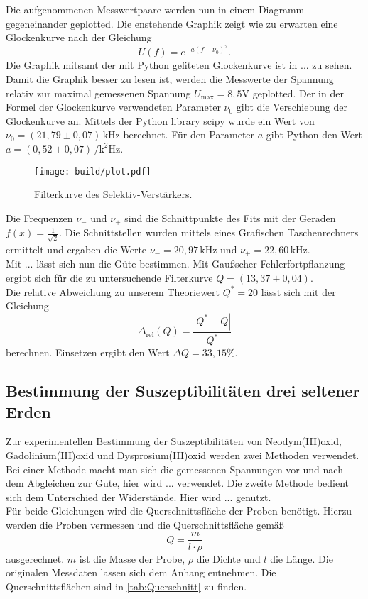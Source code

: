 Die aufgenommenen Messwertpaare werden nun in einem Diagramm gegeneinander geplotted. Die 
enstehende Graphik zeigt wie zu erwarten eine Glockenkurve nach der Gleichung
\begin{equation*}
  U(f) = e^{-a(f-\nu_0)^2}.
\end{equation*}
Die Graphik mitsamt der mit Python gefiteten Glockenkurve ist in ... zu sehen.\\
Damit die Graphik besser zu lesen ist, werden die Messwerte der Spannung relativ zur 
maximal gemessenen Spannung $U_{\mathrm{max}} = 8,5 \si{\volt}$ geplotted. Der in der Formel
der Glockenkurve verwendeten Parameter $\nu_0$ gibt die Verschiebung der Glockenkurve an.
Mittels der Python library scipy wurde ein Wert von $\nu_0 = (21,79 \pm 0,07) \, \si{\kilo\hertz} $
berechnet. Für den Parameter $a$ gibt Python den Wert 
$a = (0,52 \pm 0,07 ) \, \si{\per\square\kilo\hertz}$.\\
\begin{figure}
  \centering
  \texttt{[image: build/plot.pdf]}
  \caption{Filterkurve des Selektiv-Verstärkers.}
  \label{Abb:Absorption}
\end{figure}
Die Frequenzen $\nu_{-}$ und $\nu_{+}$ sind die Schnittpunkte des Fits mit der Geraden
$f(x) = \frac{1}{\sqrt{2}}$. Die Schnittstellen wurden mittels eines Grafischen Taschenrechners
ermittelt und ergaben die Werte $\nu_{-} = 20,97 \, \si{\kilo\hertz}$ und $\nu_{+} = 22,60 \, \si{\kilo\hertz}$.\\
Mit ... lässt sich nun die Güte bestimmen. Mit Gaußscher Fehlerfortpflanzung ergibt sich
für die zu untersuchende Filterkurve $Q = (13,37 \pm 0,04)$.\\
Die relative Abweichung zu unserem Theoriewert $Q^* = 20$ lässt sich mit der Gleichung
\begin{equation*}
    \Delta_{\mathrm{rel}}(Q) = \frac{|Q^* - Q|}{Q^*}
\end{equation*}
berechnen. Einsetzen ergibt den Wert $\Delta Q = 33,15 \%$.\\

\subsection{Bestimmung der Suszeptibilitäten drei seltener Erden}

Zur experimentellen Bestimmung der Suszeptibilitäten von Neodym(III)oxid, 
Gadolinium(III)oxid und Dysprosium(III)oxid werden zwei Methoden verwendet. 
Bei einer Methode macht man sich die gemessenen Spannungen vor und 
nach dem Abgleichen zur Gute, hier wird ... verwendet. Die zweite Methode
bedient sich dem Unterschied der Widerstände. Hier wird ... genutzt.\\
Für beide Gleichungen wird die Querschnittsfläche der Proben benötigt.
Hierzu werden die Proben vermessen und die Querschnittsfläche gemäß
\begin{equation*}
  Q = \frac{m}{l \cdot \rho}
\end{equation*}
ausgerechnet. $m$ ist die Masse der Probe, $\rho$ die Dichte und $l$ die Länge.
Die originalen Messdaten lassen sich dem Anhang entnehmen. Die Querschnittsflächen
sind in \autoref{tab:Querschnitt} zu finden.

